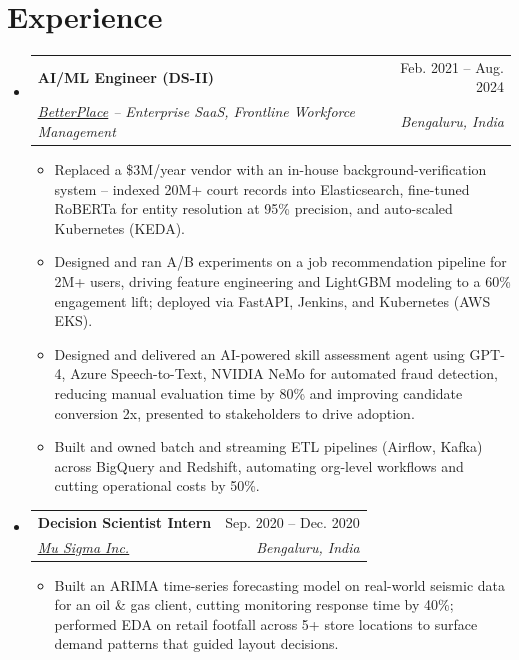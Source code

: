 \documentclass[letterpaper,11pt]{article}
\makeatletter
\newcommand{\resumeItem}[1]{
  \item\small{
    {#1 \vspace{-2pt}}
  }
}
\newcommand{\resumeSubheading}[4]{
  \vspace{-2pt}\item
    \begin{tabular*}{0.97\textwidth}[t]{l@{\extracolsep{\fill}}r}
      \textbf{#1} & #2 \\
      \textit{\small#3} & \textit{\small #4} \\
    \end{tabular*}\vspace{-7pt}
}
\newcommand{\resumeSubHeadingListStart}{\begin{itemize}[leftmargin=0.15in, label={}]}
\newcommand{\resumeSubHeadingListEnd}{\end{itemize}}
\newcommand{\resumeItemListStart}{\begin{itemize}}
\newcommand{\resumeItemListEnd}{\end{itemize}\vspace{-5pt}}
\makeatother
\begin{document}
\section{Experience}
  \resumeSubHeadingListStart
\resumeSubheading
       {AI/ML Engineer (DS-II)}{Feb. 2021 -- Aug. 2024}
      {\href{https://www.betterplace.co.in/about-us}{\underline{BetterPlace}} -- Enterprise SaaS, Frontline Workforce Management}{Bengaluru, India}
      \resumeItemListStart
        \resumeItem{Replaced a \$3M/year vendor with an in-house background-verification system --  indexed 20M+ court records into Elasticsearch, fine-tuned RoBERTa for entity resolution at 95\% precision, and auto-scaled Kubernetes (KEDA).}
        \resumeItem{Designed and ran A/B experiments on a job recommendation pipeline for 2M+ users, driving feature engineering and LightGBM modeling to a 60\% engagement lift; deployed via FastAPI, Jenkins, and Kubernetes (AWS EKS).}
        \resumeItem{Designed and delivered an AI-powered skill assessment agent using GPT-4, Azure Speech-to-Text, NVIDIA NeMo for automated fraud detection, reducing manual evaluation time by 80\% and improving candidate conversion 2x, presented to stakeholders to drive adoption.}
        \resumeItem{Built and owned batch and streaming ETL pipelines (Airflow, Kafka) across BigQuery and Redshift, automating org-level workflows and cutting operational costs by 50\%.}
      \resumeItemListEnd

    \resumeSubheading
      {Decision Scientist Intern}{Sep. 2020 -- Dec. 2020}
      {\href{https://www.mu-sigma.com/}{\underline{Mu Sigma Inc.}}}{Bengaluru, India}
      \resumeItemListStart
        \resumeItem{Built an ARIMA time-series forecasting model on real-world seismic data for an oil \& gas client, cutting monitoring response time by 40\%; performed EDA on retail footfall across 5+ store locations to surface demand patterns that guided layout decisions.} 
      \resumeItemListEnd

    \vspace{-5pt}
  \resumeSubHeadingListEnd
\end{document}
